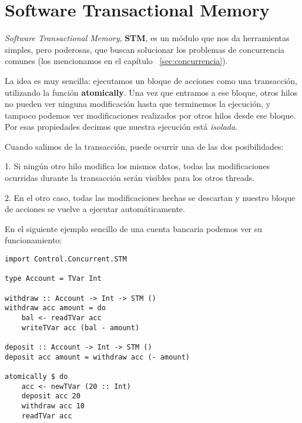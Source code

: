 
\section{Software Transactional Memory} %
\label{sec:software_transactional_memory}

\textit{Software Transactional Memory}, \textbf{STM}, es un módulo que nos da herramientas simples, pero poderosas, que buscan solucionar los problemas de concurrencia comunes (los mencionamos en el capítulo ~\ref{sec:concurrencia}).

La idea es muy sencilla: ejecutamos un bloque de acciones como una transacción, utilizando la función \textbf{atomically}. Una vez que entramos a ese bloque, otros hilos no pueden ver ninguna modificación hasta que terminemos la ejecución, y tampoco podemos ver modificaciones realizados por otros hilos desde ese bloque. Por esas propiedades decimos que nuestra ejecución está \textit{isolada}.

Cuando salimos de la transacción, puede ocurrir una de las dos posibilidades:

1. Si ningún otro hilo modifica los mismos datos, todas las modificaciones ocurridas durante la transacción serán visibles para los otros threads.

2. En el otro caso, todas las modificaciones hechas se descartan y nuestro bloque de acciones se vuelve a ejecutar automáticamente.

En el siguiente ejemplo sencillo de una cuenta bancaria podemos ver su funcionamiento:

\begin{lstlisting}
import Control.Concurrent.STM

type Account = TVar Int

withdraw :: Account -> Int -> STM ()
withdraw acc amount = do
    bal <- readTVar acc
    writeTVar acc (bal - amount)

deposit :: Account -> Int -> STM ()
deposit acc amount = withdraw acc (- amount)

atomically $ do
    acc <- newTVar (20 :: Int)
    deposit acc 20
    withdraw acc 10
    readTVar acc
\end{lstlisting}


